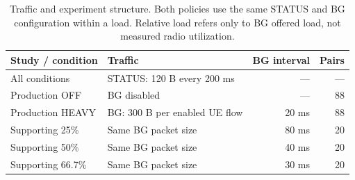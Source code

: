 \begin{table}[htbp]
\caption{Traffic and experiment structure. Both policies use the same STATUS and BG configuration within a load. Relative load refers only to BG offered load, not measured radio utilization.}\label{tab:design}
\small\begin{tabularx}{\textwidth}{lXrr}\toprule
Study / condition & Traffic & BG interval & Pairs \\\midrule
All conditions & STATUS: 120 B every 200 ms & --- & --- \\
Production OFF & BG disabled & --- & 88 \\
Production HEAVY & BG: 300 B per enabled UE flow & 20 ms & 88 \\
Supporting 25\% & Same BG packet size & 80 ms & 20 \\
Supporting 50\% & Same BG packet size & 40 ms & 20 \\
Supporting 66.7\% & Same BG packet size & 30 ms & 20 \\
\bottomrule\end{tabularx}
\end{table}
